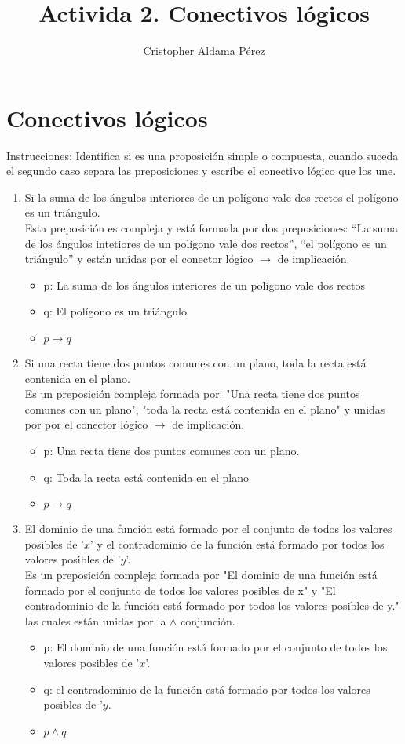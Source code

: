 \documentclass[a4paper,10pt]{article}
\title{Activida 2. Conectivos lógicos}
\author{Cristopher Aldama Pérez}
\begin{document}
\maketitle

\section{Conectivos lógicos}
Instrucciones: Identifica si es una proposición simple o compuesta, cuando suceda el segundo caso separa las preposiciones y escribe el conectivo lógico que los une.

\begin{enumerate}
\item Si la suma de los ángulos interiores de un polígono vale dos rectos el polígono es un triángulo.\\
  Esta preposición es compleja y está formada por dos preposiciones: ``La suma de los ángulos intetiores de un polígono vale dos rectos'', ``el polígono es un triángulo'' y están unidas por el conector lógico \(\to\) de implicación.
  \begin{itemize}
   \item p: La suma de los ángulos interiores de un polígono vale dos rectos
   \item q: El polígono es un triángulo
   \item \(p \to q\)
  \end{itemize}


\item Si una recta tiene dos puntos comunes con un plano, toda la recta está contenida 
en el plano.\\
Es un preposición compleja formada por: "Una recta tiene dos puntos comunes con un plano", "toda la recta está contenida en el plano" y unidas por por el conector lógico \(\to\) de implicación.
\begin{itemize}
 \item p: Una recta tiene dos puntos comunes con un plano.
 \item q: Toda la recta está contenida en el plano
 \item \(p \to q\)
\end{itemize}


\item El  dominio  de  una  función  está  formado  por  el  conjunto  de  todos  los  valores posibles de '\(x\)' y el  contradominio de la función está formado por todos los valores posibles de '\(y\)'.\\
Es un preposición compleja formada por "El  dominio  de  una  función  está  formado  por  el  conjunto  de  todos  los  valores posibles de x" y "El  contradominio de la función está formado por todos los valores posibles de y." las cuales están unidas por la \( \land \) conjunción.
\begin{itemize}
 \item p: El  dominio  de  una  función  está  formado  por  el  conjunto  de  todos  los  valores posibles de '\(x\)'.
 \item q: el  contradominio de la función está formado por todos los valores posibles de '\(y\).
 \item \(p \land q\)
\end{itemize}



\end{enumerate}
\end{document}

